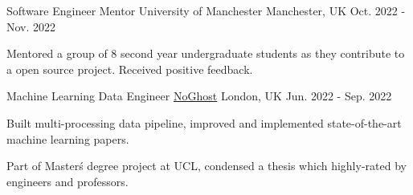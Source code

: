 



\begin{cventries}

    \cventry
        {Software Engineer Mentor} %
        {University of Manchester} %
        {Manchester, UK} %
        {Oct. 2022 - Nov. 2022} %
        {
        \begin{cvitems} %
            \item {Mentored a group of 8 second year undergraduate students as they contribute to a open source project. Received positive feedback.}
        \end{cvitems}
        }

    \cventry
        {Machine Learning Data Engineer} %
        {\href{https://www.noghost.co.uk/}{NoGhost}} %
        {London, UK} %
        {Jun. 2022 - Sep. 2022} %
        {
        \begin{cvitems} %
            \item {Built multi-processing data pipeline, improved and implemented state-of-the-art machine learning papers.}
            \item {Part of Master\'s degree project at UCL, condensed a thesis which highly-rated by engineers and professors.}
        \end{cvitems}
        }


\end{cventries}